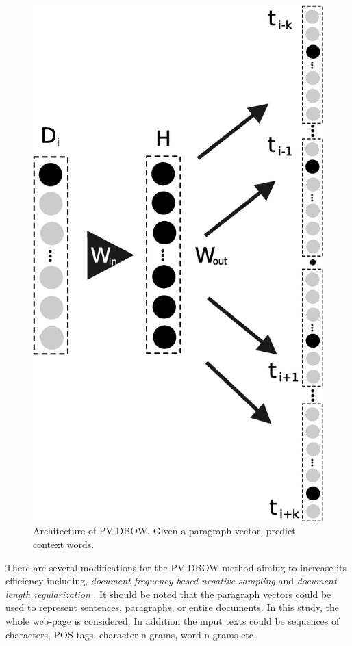 \begin{figure}[t]
	\begin{center} 
      	\includegraphics[scale=0.50]{Figures/pvbow.eps}
    		\caption{Architecture of PV-DBOW. Given a paragraph vector, predict context words.}
		\label{chap:word_embeddingss:fig:PVBOW_diagram}
	\end{center}
\end{figure}

There are several modifications for the PV-DBOW method aiming to increase its efficiency including, \textit{document frequency based negative sampling} and \textit{document length regularization} \parencite{le2014distributed,posadas2017application}. It should be noted that the paragraph vectors could be used to represent  sentences, paragraphs, or entire documents. In this study, the whole web-page is considered. In addition the input texts could be sequences of characters, POS tags, character n-grams, word n-grams etc.

